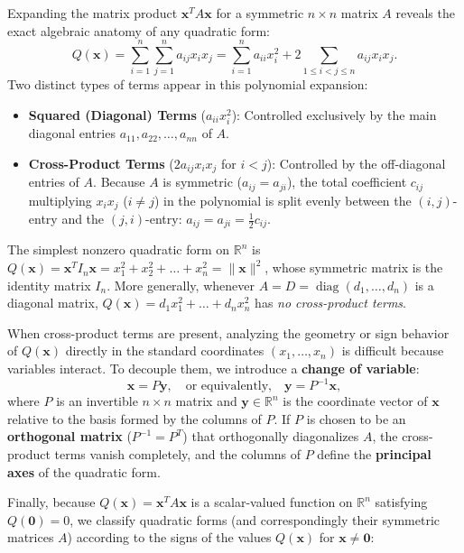 \documentclass[11pt, letterpaper]{article}
\theoremstyle{definition}
\theoremstyle{remark}
\newcommand{\R}{\mathbb{R}}
\begin{document}
Expanding the matrix product $\mathbf{x}^T A \mathbf{x}$ for a symmetric $n \times n$ matrix $A$ reveals the exact algebraic anatomy of any quadratic form:
\[
Q(\mathbf{x}) = \sum_{i=1}^{n} \sum_{j=1}^{n} a_{ij} x_i x_j = \sum_{i=1}^{n} a_{ii} x_i^2 + 2 \sum_{1 \le i < j \le n} a_{ij} x_i x_j.
\]
Two distinct types of terms appear in this polynomial expansion:
\begin{itemize}
    \item \textbf{Squared (Diagonal) Terms} ($a_{ii} x_i^2$): Controlled exclusively by the main diagonal entries $a_{11}, a_{22}, \dots, a_{nn}$ of $A$.
    \item \textbf{Cross-Product Terms} ($2 a_{ij} x_i x_j$ for $i < j$): Controlled by the off-diagonal entries of $A$. Because $A$ is symmetric ($a_{ij} = a_{ji}$), the total coefficient $c_{ij}$ multiplying $x_i x_j$ ($i \neq j$) in the polynomial is split evenly between the $(i,j)$-entry and the $(j,i)$-entry: $a_{ij} = a_{ji} = \frac{1}{2} c_{ij}$.
\end{itemize}
The simplest nonzero quadratic form on $\R^n$ is $Q(\mathbf{x}) = \mathbf{x}^T I_n \mathbf{x} = x_1^2 + x_2^2 + \dots + x_n^2 = \|\mathbf{x}\|^2$, whose symmetric matrix is the identity matrix $I_n$. More generally, whenever $A = D = \operatorname{diag}(d_1, \dots, d_n)$ is a diagonal matrix, $Q(\mathbf{x}) = d_1 x_1^2 + \dots + d_n x_n^2$ has \emph{no cross-product terms}.

When cross-product terms are present, analyzing the geometry or sign behavior of $Q(\mathbf{x})$ directly in the standard coordinates $(x_1, \dots, x_n)$ is difficult because variables interact. To decouple them, we introduce a \textbf{change of variable}:
\[
\mathbf{x} = P\mathbf{y}, \quad \text{or equivalently,} \quad \mathbf{y} = P^{-1}\mathbf{x},
\]
where $P$ is an invertible $n \times n$ matrix and $\mathbf{y} \in \R^n$ is the coordinate vector of $\mathbf{x}$ relative to the basis formed by the columns of $P$. If $P$ is chosen to be an \textbf{orthogonal matrix} ($P^{-1} = P^T$) that orthogonally diagonalizes $A$, the cross-product terms vanish completely, and the columns of $P$ define the \textbf{principal axes} of the quadratic form.

Finally, because $Q(\mathbf{x}) = \mathbf{x}^T A \mathbf{x}$ is a scalar-valued function on $\R^n$ satisfying $Q(\mathbf{0}) = 0$, we classify quadratic forms (and correspondingly their symmetric matrices $A$) according to the signs of the values $Q(\mathbf{x})$ for $\mathbf{x} \neq \mathbf{0}$:
\end{document}
